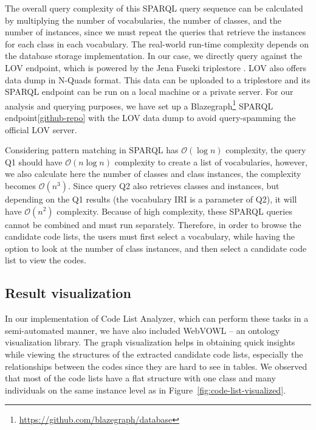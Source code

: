 The overall query complexity of this SPARQL query sequence can be calculated by multiplying the number of vocabularies, the number of classes, and the number of instances, since we must repeat the queries that retrieve the instances for each class in each vocabulary. The real-world run-time complexity depends on the database storage implementation. In our case, we directly query against the LOV endpoint, which is powered by the Jena Fuseki triplestore \cite{DBLP:journals/semweb/VandenbusscheAP17}. %
LOV also offers data dump in N-Quads format. This data can be uploaded to a triplestore and its SPARQL endpoint can be run on a local machine or a private server. For our analysis and querying purposes, we have set up a Blazegraph\footnote{\url{https://github.com/blazegraph/database}} SPARQL endpoint\cref{github-repo} with the LOV data dump to avoid query-spamming the official LOV server.

Considering pattern matching in SPARQL has $\mathcal{O}(\log{}n)$ complexity, the query Q1 should have $\mathcal{O}(n\log{}n)$ complexity to create a list of vocabularies, however, we also calculate here the number of classes and class instances, the complexity becomes $\mathcal{O}(n^3)$. Since query Q2 also retrieves classes and instances, but depending on the Q1 results (the vocabulary IRI is a parameter of Q2), it will have $\mathcal{O}(n^2)$ complexity. Because of high complexity, these SPARQL queries cannot be combined and must run separately. Therefore, in order to browse the candidate code lists, the users must first select a vocabulary, while having the option to look at the number of class instances, and then select a candidate code list to view the codes.

\subsection{Result visualization}

In our implementation of Code List Analyzer, which can perform these tasks in a semi-automated manner, we have also included WebVOWL \cite{DBLP:journals/semweb/LohmannNHE15} -- an ontology visualization library. The graph visualization helps in obtaining quick insights while viewing the structures of the extracted candidate code lists, especially the relationships between the codes since they are hard to see in tables. We observed that most of the code lists have a flat structure with one class and many individuals on the same instance level as in Figure~\ref{fig:code-list-visualized}.
